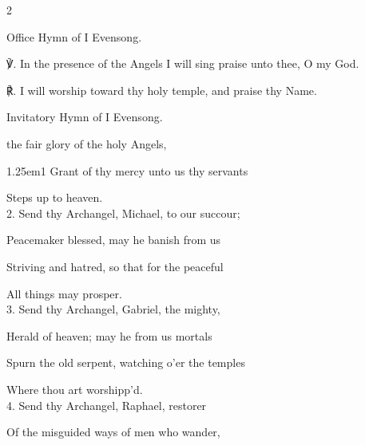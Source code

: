 \begin{paracol}{2}
\secondEvensong
{}

\begin{rubric}
	Office Hymn of I Evensong.
\end{rubric}

℣. In the presence of the Angels I will sing praise unto thee, O my God.

℟. I will worship toward thy holy temple, and praise thy Name.


\switchcolumn


\mattins
{}

\begin{rubric}
	Invitatory Hymn of I Evensong.
\end{rubric}

\mattinsOfficeHymn
{} the fair glory of the holy Angels,


\begin{hangparas}{1.25em}{1}
Grant of thy mercy unto us thy servants

Steps up to heaven.\\

2. Send thy Archangel, Michael, to our succour;

Peacemaker blessed, may he banish from us

Striving and hatred, so that for the peaceful

All things may prosper.\\

3. Send thy Archangel, Gabriel, the mighty,

Herald of heaven; may he from us mortals

Spurn the old serpent, watching o’er the temples

Where thou art worshipp'd.\\

4. Send thy Archangel, Raphael, restorer

Of the misguided ways of men who wander,


\end{hangparas}
\end{paracol}
